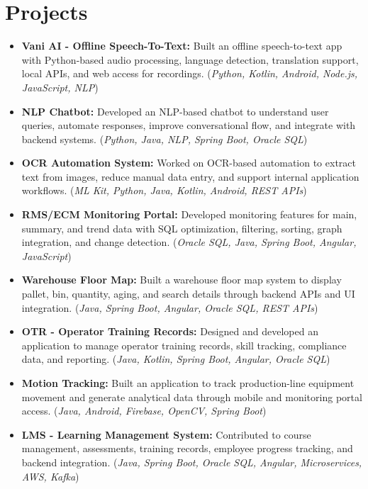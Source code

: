 \documentclass[10pt, a4paper]{article}
\begin{document}
\section*{Projects}
\begin{itemize}[leftmargin=1.5em, itemsep=0.45ex, topsep=0.3ex, label=\textbullet]

\item \textbf{Vani AI - Offline Speech-To-Text:}
Built an offline speech-to-text app with Python-based audio processing, language detection, translation support, local APIs, and web access for recordings.
(\textit{Python, Kotlin, Android, Node.js, JavaScript, NLP})

\item \textbf{NLP Chatbot:}
Developed an NLP-based chatbot to understand user queries, automate responses, improve conversational flow, and integrate with backend systems.
(\textit{Python, Java, NLP, Spring Boot, Oracle SQL})

\item \textbf{OCR Automation System:}
Worked on OCR-based automation to extract text from images, reduce manual data entry, and support internal application workflows.
(\textit{ML Kit, Python, Java, Kotlin, Android, REST APIs})

\item \textbf{RMS/ECM Monitoring Portal:}
Developed monitoring features for main, summary, and trend data with SQL optimization, filtering, sorting, graph integration, and change detection.
(\textit{Oracle SQL, Java, Spring Boot, Angular, JavaScript})

\item \textbf{Warehouse Floor Map:}
Built a warehouse floor map system to display pallet, bin, quantity, aging, and search details through backend APIs and UI integration.
(\textit{Java, Spring Boot, Angular, Oracle SQL, REST APIs})

\item \textbf{OTR - Operator Training Records:}
Designed and developed an application to manage operator training records, skill tracking, compliance data, and reporting.
(\textit{Java, Kotlin, Spring Boot, Angular, Oracle SQL})

\item \textbf{Motion Tracking:}
Built an application to track production-line equipment movement and generate analytical data through mobile and monitoring portal access.
(\textit{Java, Android, Firebase, OpenCV, Spring Boot})

\item \textbf{LMS - Learning Management System:}
Contributed to course management, assessments, training records, employee progress tracking, and backend integration.
(\textit{Java, Spring Boot, Oracle SQL, Angular, Microservices, AWS, Kafka})


\end{itemize}
\end{document}
